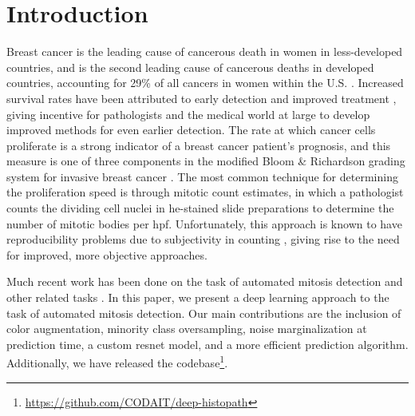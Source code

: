\section{Introduction}

Breast cancer is the leading cause of cancerous death in women in less-developed countries, and is the second leading cause of cancerous deaths in developed countries, accounting for 29\% of all cancers in women within the U.S. \cite{siegel2018cancer,torre2015global}.  Increased survival rates have been attributed to early detection and improved treatment \cite{torre2015global}, giving incentive for pathologists and the medical world at large to develop improved methods for even earlier detection.
The rate at which cancer cells proliferate is a strong indicator of a breast cancer patient’s prognosis, and this measure is one of three components in the modified Bloom \& Richardson grading system for invasive breast cancer \cite{al2004prognostic}.  The most common technique for determining the proliferation speed is through mitotic count estimates, in which a pathologist counts the dividing cell nuclei in \gls{he}-stained slide preparations to determine the number of mitotic bodies per \gls{hpf}.
Unfortunately, this approach is known to have reproducibility problems due to subjectivity in counting \cite{veta2016mitosis}, giving rise to the need for improved, more objective approaches.

Much recent work has been done on the task of automated mitosis detection and other related tasks \cite{Ciresan:2013hm, Paeng:2016vi, Lafarge:2017ud, Janowczyk:2016gv, Liu:2017uu, Ertosun:2015vo}. In this paper, we present a deep learning approach to the task of automated mitosis detection.  Our main contributions are the inclusion of color augmentation, minority class oversampling, noise marginalization at prediction time, a custom \gls{resnet} model, and a more efficient prediction algorithm.  Additionally, we have released the codebase\footnote{\url{https://github.com/CODAIT/deep-histopath}}.

